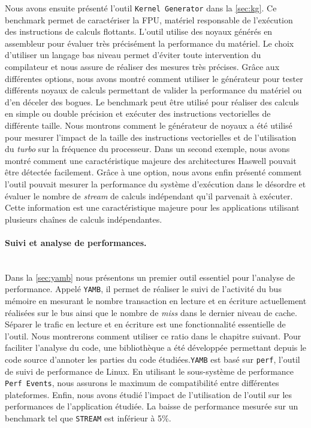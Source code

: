     Nous avons ensuite présenté l'outil \verb|Kernel Generator| dans la \autoref{sec:kg}. Ce benchmark permet de caractériser la FPU, matériel responsable de l'exécution des instructions de calculs flottants. L'outil utilise des noyaux générés en assembleur pour évaluer très précisément la performance du matériel. Le choix d'utiliser un langage bas niveau permet d'éviter toute intervention du compilateur et nous assure de réaliser des mesures très précises. Grâce aux différentes options, nous avons montré comment utiliser le générateur pour tester différents noyaux de calculs permettant de valider la performance du matériel ou d'en déceler des bogues. Le benchmark peut être utilisé pour réaliser des calculs en simple ou double précision et exécuter des instructions vectorielles de différente taille. Nous montrons comment le générateur de noyaux a été utilisé pour mesurer l'impact de la taille des instructions vectorielles et de l'utilisation du \textit{turbo} sur la fréquence du processeur. Dans un second exemple, nous avons montré comment une caractéristique majeure des architectures Haswell pouvait être détectée facilement. Grâce à une option, nous avons enfin présenté comment l'outil pouvait mesurer la performance du système d'exécution dans le désordre et évaluer le nombre de \textit{stream} de calculs indépendant qu'il parvenait à exécuter. Cette information est une caractéristique majeure pour les applications utilisant plusieurs chaînes de calculs indépendantes.  
    
    
\paragraph{Suivi et analyse de performances.}
~\\
    
    Dans la \autoref{sec:yamb} nous présentons un premier outil essentiel pour l'analyse de performance. Appelé \verb=YAMB=, il permet de réaliser le suivi de l'activité du bus mémoire en mesurant le nombre transaction en lecture et en écriture actuellement réalisées sur le bus ainsi que le nombre de \textit{miss} dans le dernier niveau de cache. Séparer le trafic en lecture et en écriture est une fonctionnalité essentielle de l'outil. Nous montrerons comment utiliser ce ratio dans le chapitre suivant. Pour faciliter l'analyse du code, une bibliothèque a été développée permettant depuis le code source d'annoter les parties du code étudiées.\verb=YAMB= est basé sur \verb=perf=, l'outil de suivi de performance de Linux. En utilisant le sous-système de performance \verb=Perf Events=, nous assurons le maximum de compatibilité entre différentes plateformes. Enfin, nous avons étudié l'impact de l'utilisation de l'outil sur les performances de l'application étudiée. La baisse de performance mesurée sur un benchmark tel que \verb=STREAM= est inférieur à 5\%.\\
    
